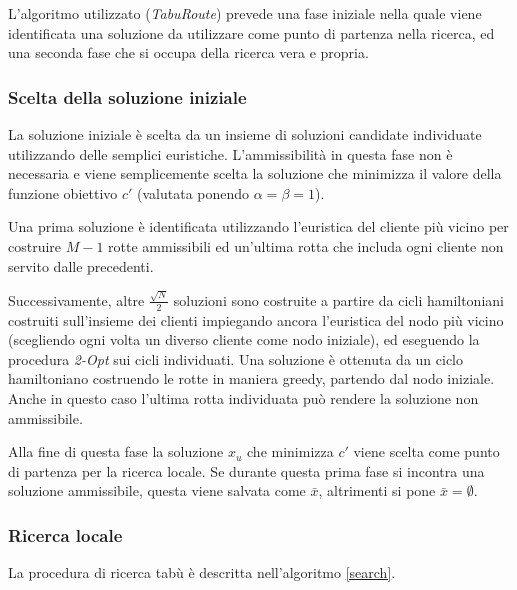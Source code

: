 \documentclass[11pt,oneside,a4paper]{article}
\begin{document}
L'algoritmo utilizzato (\emph{TabuRoute}) prevede una fase iniziale nella quale viene
identificata una soluzione da utilizzare come punto di partenza nella ricerca, ed una seconda
fase che si occupa della ricerca vera e propria.

\subsubsection{Scelta della soluzione iniziale}

La soluzione iniziale è scelta da un insieme di soluzioni candidate individuate utilizzando
delle semplici euristiche. L'ammissibilità in questa fase non è necessaria e viene semplicemente
scelta la soluzione che minimizza il valore della funzione obiettivo $c'$ (valutata ponendo
$\alpha = \beta = 1$).

Una prima soluzione è identificata utilizzando l'euristica del cliente più vicino per costruire
$M-1$ rotte ammissibili ed un'ultima rotta che includa ogni cliente non servito dalle precedenti.

Successivamente, altre $\frac{\sqrt{N}}{2}$ soluzioni sono costruite a partire da cicli
hamiltoniani costruiti sull'insieme dei clienti impiegando ancora l'euristica del nodo
più vicino (scegliendo ogni volta un diverso cliente come nodo iniziale), ed eseguendo la
procedura \emph{2-Opt} sui cicli individuati. Una soluzione è ottenuta da un ciclo hamiltoniano
costruendo le rotte in maniera greedy, partendo dal nodo iniziale. Anche in questo caso l'ultima
rotta individuata può rendere la soluzione non ammissibile.

Alla fine di questa fase la soluzione $x_u$ che minimizza $c'$ viene scelta come punto
di partenza per la ricerca locale. Se durante questa prima fase si incontra una soluzione ammissibile,
questa viene salvata come $\bar{x}$, altrimenti si pone $\bar{x} = \emptyset$.

\subsubsection{Ricerca locale}
La procedura di ricerca tabù è descritta nell'algoritmo \ref{search}.
\end{document}

